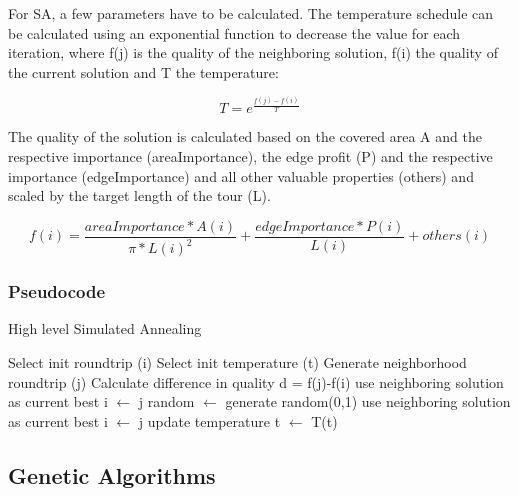 For SA, a few parameters have to be calculated.
The temperature schedule can be calculated using an exponential function to decrease the value for each iteration, where f(j) is the quality of the neighboring solution, f(i) the quality of the current solution and T the temperature: 

\begin{equation}\label{eq:temperatureSchedule}
	T = e^{\frac{f(j)-f(i)}{T}}	
\end{equation}

The quality of the solution is calculated based on the covered area A and the respective importance (areaImportance), the edge profit (P) and the respective importance (edgeImportance) and all other valuable properties (others) and scaled by the target length of the tour (L). 

\begin{equation}\label{eq:qualitySA}
	f(i) = \frac{areaImportance * A(i)}{\pi * L(i)^2} + \frac{edgeImportance * P(i)}{L(i)} + others(i)
\end{equation}


\subsubsection{Pseudocode}
\label{subsubsec:SAPseudocode}



\begin{algorithm}
	\caption{High level Simulated Annealing}
	\label{alg:SApseudocode}
	\begin{algorithmic}[1]
		\STATE Select init roundtrip (i)
		\STATE Select init temperature (t)
				\STATE Generate neighborhood roundtrip (j)
				\STATE Calculate difference in quality d = f(j)-f(i)
						\STATE use neighboring solution as current best i $\gets$ j
					\ELSE 
						\STATE random $\gets$ generate random(0,1)
							\STATE use neighboring solution as current best i $\gets$ j
						\ENDIF
					\ENDIF
			 \ENDFOR
			 \STATE update temperature t $\gets$ T(t)
		 \ENDFOR
	\end{algorithmic}
\end{algorithm}










\subsection{Genetic Algorithms}
\label{subsec:geneticAlgorithmsBackground}



